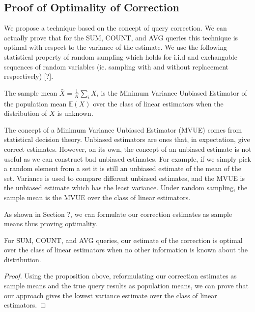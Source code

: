 \subsection{Proof of Optimality of Correction}
We propose a technique based on the concept of query correction.
We can actually prove that for the SUM, COUNT, and AVG queries this technique is optimal with respect to the variance of the estimate.
We use the following statistical property of random sampling which holds for i.i.d and exchangable sequences of random variables (ie. sampling with and without replacement respectively) [?].
\begin{proposition}
The sample mean $\bar{X} = \frac{1}{K}\sum_i X_i$ is the Minimum Variance Unbiased Estimator of the population mean $\mathbb{E}(X)$ over the class of linear estimators when the distribution of $X$ is unknown.
\end{proposition}
The concept of a Minimum Variance Unbiased Estimator (MVUE) comes from statistical decision theory.
Unbiased estimators are ones that, in expectation, give correct estimates.
However, on its own, the concept of an unbiased estimate is not useful as we can construct bad unbiased estimates.
For example, if we simply pick a random element from a set it is still an unbiased estimate of the mean of the set.
Variance is used to compare different unbiased estimates, and the MVUE is the unbiased estimate which has the least variance.
Under random sampling, the sample mean is the MVUE over the class of linear estimators.

As shown in Section ?, we can formulate our correction estimates as sample means thus proving optimality. 
\begin{theorem}
For SUM, COUNT, and AVG queries, our estimate of the correction is optimal over the class of linear estimators when no other information is known about the distribution. 
\end{theorem}
\begin{proof}
Using the proposition above, reformulating our correction estimates as sample means and the true query results as population means, we can prove that our approach gives the lowest variance estimate over the class of linear estimators.
\end{proof}

